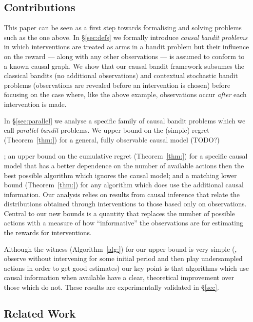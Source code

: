 \subsection{Contributions}

This paper can be seen as a first step towards formalising and solving problems such as the one above. 
In \S\ref{sec:defs} we formally introduce \emph{causal bandit problems} in which interventions are treated as arms in a bandit problem but their influence on the reward --- along with any other observations --- is assumed to conform to a known causal graph. 
We show that our causal bandit framework subsumes the classical bandits (no additional observations) and contextual stochastic bandit problems (observations are revealed before an intervention is chosen) before focusing on the case where, like the above example, observations occur \emph{after} each intervention is made.

In \S\ref{sec:parallel} we analyse a specific family of causal bandit problems which we call \emph{parallel bandit} problems.
We  upper bound on the (simple) regret (Theorem~\ref{thm:}) for a general, fully observable causal model (TODO?)

; an upper bound on the cumulative regret (Theorem~\ref{thm:}) for a specific causal model that has a better dependence on the number of available actions then the best possible algorithm which ignores the causal model; and a matching lower bound (Theorem~\ref{thm:}) for any algorithm which does use the additional causal information.
Our analysis relies on results from causal inference that relate the distributions obtained through interventions to those based only on observations.
Central to our new bounds is a quantity that replaces the number of possible actions with a measure of how ``informative'' the observations are for estimating the rewards for interventions.

Although the witness (Algorithm~\ref{alg:}) for our upper bound is very simple (\ie, observe without intervening for some initial period and then play undersampled actions in order to get good estimates) our key point is that algorithms which use causal information when available have a clear, theoretical improvement over those which do not.
These results are experimentally validated in \S\ref{sec}.


\subsection{Related Work}

